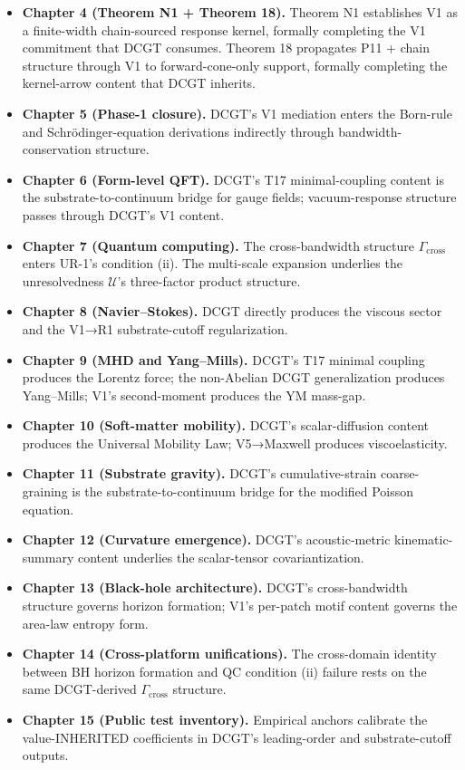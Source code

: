\documentclass[11pt]{book}
\begin{document}
\begin{itemize}
\item \textbf{Chapter 4 (Theorem N1 + Theorem 18).} Theorem N1 establishes V1 as a finite-width chain-sourced response kernel, formally completing the V1 commitment that DCGT consumes. Theorem 18 propagates P11 + chain structure through V1 to forward-cone-only support, formally completing the kernel-arrow content that DCGT inherits.
\item \textbf{Chapter 5 (Phase-1 closure).} DCGT's V1 mediation enters the Born-rule and Schrödinger-equation derivations indirectly through bandwidth-conservation structure.
\item \textbf{Chapter 6 (Form-level QFT).} DCGT's T17 minimal-coupling content is the substrate-to-continuum bridge for gauge fields; vacuum-response structure passes through DCGT's V1 content.
\item \textbf{Chapter 7 (Quantum computing).} The cross-bandwidth structure $\Gamma_\mathrm{cross}$ enters UR-1's condition (ii). The multi-scale expansion underlies the unresolvedness $\mathcal{U}$'s three-factor product structure.
\item \textbf{Chapter 8 (Navier–Stokes).} DCGT directly produces the viscous sector and the V1→R1 substrate-cutoff regularization.
\item \textbf{Chapter 9 (MHD and Yang–Mills).} DCGT's T17 minimal coupling produces the Lorentz force; the non-Abelian DCGT generalization produces Yang–Mills; V1's second-moment produces the YM mass-gap.
\item \textbf{Chapter 10 (Soft-matter mobility).} DCGT's scalar-diffusion content produces the Universal Mobility Law; V5→Maxwell produces viscoelasticity.
\item \textbf{Chapter 11 (Substrate gravity).} DCGT's cumulative-strain coarse-graining is the substrate-to-continuum bridge for the modified Poisson equation.
\item \textbf{Chapter 12 (Curvature emergence).} DCGT's acoustic-metric kinematic-summary content underlies the scalar-tensor covariantization.
\item \textbf{Chapter 13 (Black-hole architecture).} DCGT's cross-bandwidth structure governs horizon formation; V1's per-patch motif content governs the area-law entropy form.
\item \textbf{Chapter 14 (Cross-platform unifications).} The cross-domain identity between BH horizon formation and QC condition (ii) failure rests on the same DCGT-derived $\Gamma_\mathrm{cross}$ structure.
\item \textbf{Chapter 15 (Public test inventory).} Empirical anchors calibrate the value-INHERITED coefficients in DCGT's leading-order and substrate-cutoff outputs.
\end{itemize}
\end{document}
